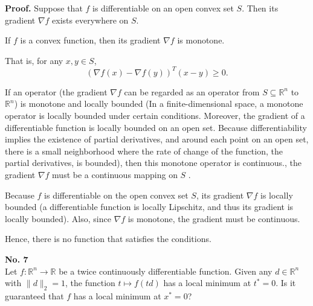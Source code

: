 \documentclass[a4paper, 11pt]{article}
\newenvironment{problem}[2][No.]
    { \begin{mdframed}[backgroundcolor=gray!5] \textbf{#1 #2} \\}
    {  \end{mdframed}}
\newenvironment{solution}
    {\textbf{Proof.}}
    {}
\begin{document}
\begin{solution}
	Suppose that \( f \) is differentiable on an open convex set \( S \). Then its gradient \( \nabla f \) exists everywhere on \( S \). 
	
	 If \( f \) is a convex function, then its gradient \( \nabla f \) is monotone.
	
	That is, for any \( x, y \in S \), 
	$$ (\nabla f(x) - \nabla f(y))^T(x - y) \geq 0 .$$

	If an operator (the gradient \(\nabla f\) can be regarded as an operator from \(S\subseteq\mathbb{R}^n\) to \(\mathbb{R}^n\)) is monotone and locally bounded (In a finite-dimensional space, a monotone operator is locally bounded under certain conditions. Moreover, the gradient of a differentiable function is locally bounded on an open set. Because differentiability implies the existence of partial derivatives, and around each point on an open set, there is a small neighborhood where the rate of change of the function, the partial derivatives, is bounded), then this monotone operator is continuous., the gradient \( \nabla f \) must be a continuous mapping on \( S \) . 
	
	Because \( f \) is differentiable on the open convex set \( S \), its gradient \( \nabla f \) is locally bounded (a differentiable function is locally Lipschitz, and thus its gradient is locally bounded). Also, since \( \nabla f \) is monotone, the gradient must be continuous. 
	
	Hence, there is no function that satisfies the conditions. 
\end{solution}

\begin{problem}{7}
	Let \( f : \mathbb{R}^n \to \mathbb{R} \) be a twice continuously differentiable function. Given any \( d \in \mathbb{R}^n \) with \( \|d\|_2 = 1 \), the function \( t \mapsto f(td) \) has a local minimum at \( t^* = 0 \). Is it guaranteed that \( f \) has a local minimum at \( x^* = 0 \)?
\end{problem}
\end{document}
